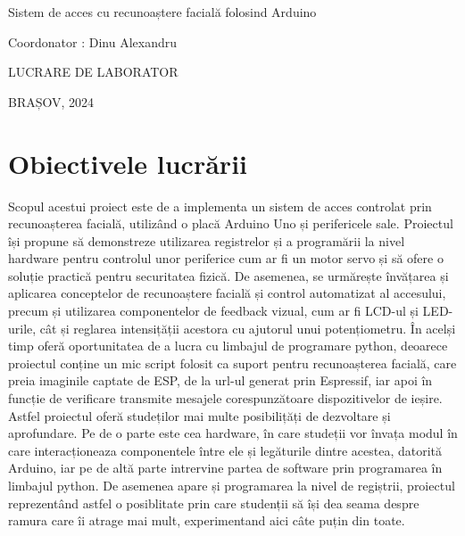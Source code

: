 \documentclass{report}
\begin{document}
\begin{center}
\vspace*{3cm}
{\headingfont\huge Sistem de acces cu recunoaștere facială folosind Arduino\par}
{\headingfont\small Coordonator : Dinu Alexandru \par}
\vspace{3cm}
{\Large LUCRARE DE LABORATOR\par}
\vspace{2cm}
{\small BRAȘOV, 2024\par}
\vfill
\end{center}

\vspace*{3cm}

\tableofcontents
\thispagestyle{empty} %


\chapter{Obiectivele lucrării}
Scopul acestui proiect este de a implementa un sistem de acces controlat prin recunoașterea facială, utilizând o placă Arduino Uno și perifericele sale. Proiectul își propune să demonstreze utilizarea registrelor și a programării la nivel hardware pentru controlul unor periferice cum ar fi un motor servo și să ofere o soluție practică pentru securitatea fizică. 
De asemenea, se urmărește învățarea și aplicarea conceptelor de recunoaștere facială și control automatizat al accesului, precum și utilizarea componentelor de feedback vizual, cum ar fi LCD-ul și LED-urile, cât și reglarea intensițății acestora cu ajutorul unui potențiometru.
În acelși timp oferă oportunitatea de a lucra cu limbajul de programare python, deoarece proiectul conține un mic script folosit ca suport pentru recunoașterea facială, care preia imaginile captate de ESP, de la url-ul generat prin Espressif, iar apoi în funcție de verificare transmite mesajele corespunzătoare dispozitivelor de ieșire. 
Astfel proiectul oferă studeților mai multe posibilițăți de dezvoltare și aprofundare. Pe de o parte este cea hardware, în care studeții vor învața modul în care interacționeaza componentele între ele și legăturile dintre acestea, datorită Arduino, iar pe de altă parte intrervine partea de software prin programarea în limbajul python. De asemenea apare și programarea la nivel de regiștrii, proiectul reprezentând astfel o posiblitate prin care studenții să își dea seama despre ramura care îi atrage mai mult, experimentand aici câte puțin din toate.   
\end{document}
